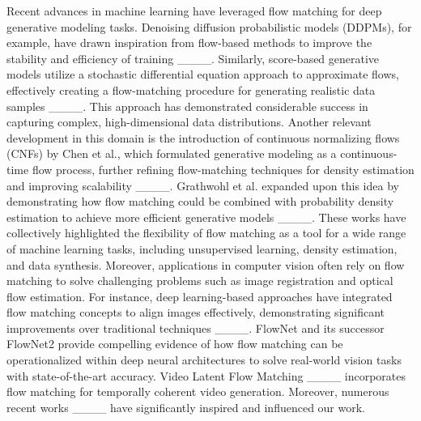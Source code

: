 Recent advances in machine learning have leveraged flow matching for deep generative modeling tasks. Denoising diffusion probabilistic models (DDPMs), for example, have drawn inspiration from flow-based methods to improve the stability and efficiency of training ____. Similarly, score-based generative models utilize a stochastic differential equation approach to approximate flows, effectively creating a flow-matching procedure for generating realistic data samples ____. This approach has demonstrated considerable success in capturing complex, high-dimensional data distributions. Another relevant development in this domain is the introduction of continuous normalizing flows (CNFs) by Chen et al., which formulated generative modeling as a continuous-time flow process, further refining flow-matching techniques for density estimation and improving scalability ____. Grathwohl et al. expanded upon this idea by demonstrating how flow matching could be combined with probability density estimation to achieve more efficient generative models ____. These works have collectively highlighted the flexibility of flow matching as a tool for a wide range of machine learning tasks, including unsupervised learning, density estimation, and data synthesis. Moreover, applications in computer vision often rely on flow matching to solve challenging problems such as image registration and optical flow estimation. For instance, deep learning-based approaches have integrated flow matching concepts to align images effectively, demonstrating significant improvements over traditional techniques ____. FlowNet and its successor FlowNet2 provide compelling evidence of how flow matching can be operationalized within deep neural architectures to solve real-world vision tasks with state-of-the-art accuracy. Video Latent Flow Matching ____ incorporates flow matching for temporally coherent video generation.
Moreover, numerous recent works ____ have significantly inspired and influenced our work.